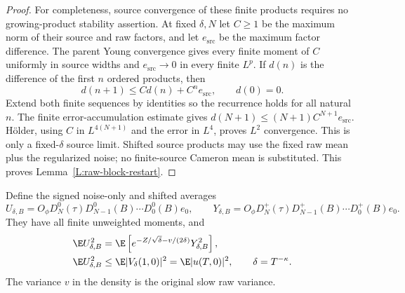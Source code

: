 \begin{proof}
  For completeness, source convergence of these finite products
  requires no growing-product stability assertion. At fixed $\delta,N$
  let $C\ge1$ be the maximum norm of their source and raw factors,
  and let $e_{\mathrm{src}}$ be the maximum factor difference.
  The parent Young convergence gives every finite moment of $C$
  uniformly in source widths and $e_{\mathrm{src}}\to0$ in every
  finite $L^p$. If $d(n)$ is the difference of the first $n$
  ordered products, then
  \[
    d(n+1)\le C d(n)+C^n e_{\mathrm{src}},\qquad d(0)=0.
  \]
  Extend both finite sequences by identities so the recurrence
  holds for all natural $n$. The finite error-accumulation estimate
  gives $d(N+1)\le(N+1)C^{N+1}e_{\mathrm{src}}$.
  H\"older, using $C$ in $L^{4(N+1)}$ and the error in $L^4$,
  proves $L^2$ convergence. This is only a fixed-$\delta$ source limit.
  Shifted source products may use the fixed raw mean plus the
  regularized noise; no finite-source Cameron mean is substituted.
  This proves Lemma~\ref{L:raw-block-restart}.
\end{proof}

\begin{proposition}
  \label{P:raw-block-point-comparison}
  Define the signed noise-only and shifted averages
  \[
    U_{\delta,B}
    =O_\phi D_N^0(\tau)D_{N-1}^0(B)\cdots D_0^0(B)e_0,
    \qquad
    Y_{\delta,B}
    =O_\phi D_N^+(\tau)D_{N-1}^+(B)\cdots D_0^+(B)e_0.
  \]
  They have all finite unweighted moments, and
  \begin{align}
    \E U_{\delta,B}^2
    &=\E\left[e^{-Z/\sqrt\delta-v/(2\delta)}
    Y_{\delta,B}^2\right],
    \label{E:raw-block-square-identity}\\
    \E U_{\delta,B}^2
    &\le\E|V_\delta(1,0)|^2
    =\E|u(T,0)|^2,\qquad \delta=T^{-\kappa}.
    \label{E:raw-block-original-comparison}
  \end{align}
  The variance $v$ in the density is the original slow raw variance.
\end{proposition}

